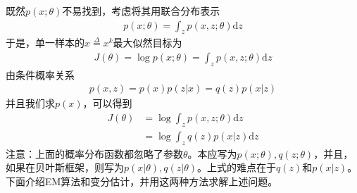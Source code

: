         \par
        既然$p(x;\theta)$不易找到，考虑将其用联合分布表示
        \begin{align*}
        p(x;\theta) = \int_zp(x,z;\theta)\mathrm{d}z
        \end{align*}
        于是，单一样本的$x \overset{\Delta}{=}x^k$最大似然目标为
        \begin{align*}
        J(\theta) = \log p(x;\theta) = \int_zp(x,z;\theta)\mathrm{d}z
        \end{align*}
        由条件概率关系
        \begin{align*}
        p(x,z) = p(x)p(z|x) = q(z)p(x|z)
        \end{align*}
        并且我们求$p(x)$，可以得到
        \begin{align*}
        J(\theta) &= \log \int_z p(x,z;\theta)\mathrm{d}z\\
        &=\log \int_z q(z)p(x|z)\mathrm{d}z
        \end{align*}
        注意：上面的概率分布函数都忽略了参数$\theta$。本应写为$p(x;\theta),q(z;\theta)$，并且，如果在贝叶斯框架，则写为$p(x|\theta),q(z|\theta)$。上式的难点在于$q(z)$和$p(x|z)$。下面介绍EM算法和变分估计，并用这两种方法求解上述问题。
